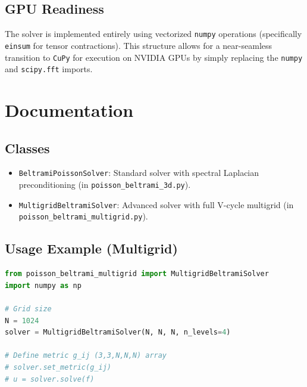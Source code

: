 \documentclass[11pt]{article}
\begin{document}
\subsection{GPU Readiness}
The solver is implemented entirely using vectorized \texttt{numpy} operations (specifically \texttt{einsum} for tensor contractions). This structure allows for a near-seamless transition to \texttt{CuPy} for execution on NVIDIA GPUs by simply replacing the \texttt{numpy} and \texttt{scipy.fft} imports.

\section{Documentation}
\subsection{Classes}
\begin{itemize}
    \item \texttt{BeltramiPoissonSolver}: Standard solver with spectral Laplacian preconditioning (in \texttt{poisson\_beltrami\_3d.py}).
    \item \texttt{MultigridBeltramiSolver}: Advanced solver with full V-cycle multigrid (in \texttt{poisson\_beltrami\_multigrid.py}).
\end{itemize}

\subsection{Usage Example (Multigrid)}
\begin{lstlisting}[language=Python]
from poisson_beltrami_multigrid import MultigridBeltramiSolver
import numpy as np

# Grid size
N = 1024
solver = MultigridBeltramiSolver(N, N, N, n_levels=4)

# Define metric g_ij (3,3,N,N,N) array
# solver.set_metric(g_ij)
# u = solver.solve(f)
\end{lstlisting}
\end{document}
